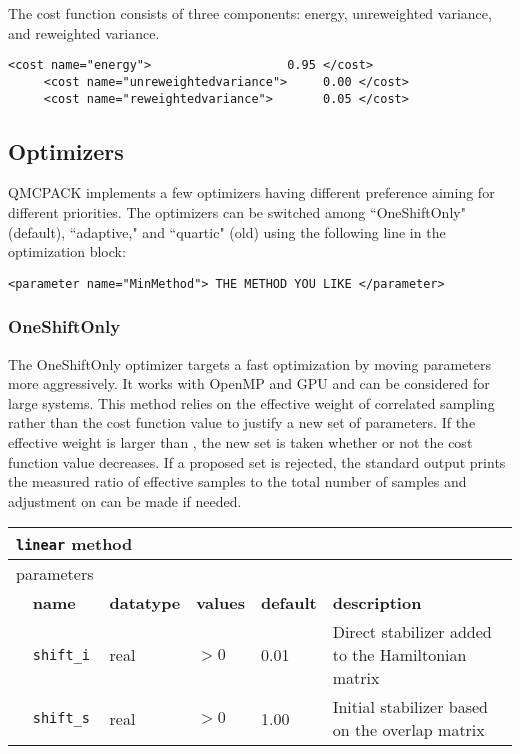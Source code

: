 The cost function consists of three components: energy, unreweighted variance, and reweighted variance.
\begin{lstlisting}[style=QMCPXML]
     <cost name="energy">                   0.95 </cost>
     <cost name="unreweightedvariance">     0.00 </cost>
     <cost name="reweightedvariance">       0.05 </cost>
\end{lstlisting}

\subsection{Optimizers}
QMCPACK implements a few optimizers having different preference aiming for different priorities.
The optimizers can be switched among  ``OneShiftOnly" (default), ``adaptive," and ``quartic" (old) using the following line in the optimization block:
\begin{lstlisting}
<parameter name="MinMethod"> THE METHOD YOU LIKE </parameter>
\end{lstlisting}

\subsubsection{OneShiftOnly}
The OneShiftOnly optimizer targets a fast optimization by moving parameters more aggressively. It works with OpenMP and GPU and can be considered for large systems.
This method relies on the effective weight of correlated sampling rather than the cost function value to justify a new set of parameters.
If the effective weight is larger than , the new set is taken whether or not the cost function value decreases.
If a proposed set is rejected, the standard output prints the measured ratio of effective samples to the total number of samples
and adjustment on  can be made if needed.

\begin{table}[h]
\begin{center}
\begin{tabularx}{\textwidth}{l l l l l X }
\hline
\multicolumn{6}{l}{\texttt{linear} method} \\
\hline
\multicolumn{2}{l}{parameters}  & \multicolumn{4}{l}{}\\
   &   \bfseries name     & \bfseries datatype & \bfseries values & \bfseries default   & \bfseries description \\
   &   \texttt{shift\_i} &  real     & $>0$ & 0.01 & Direct stabilizer added to the Hamiltonian matrix\\
   &   \texttt{shift\_s} &  real     & $>0$ & 1.00 & Initial stabilizer based on the overlap matrix\\
  \hline
\end{tabularx}
\end{center}
\end{table}

